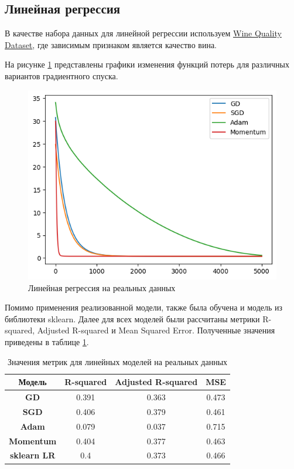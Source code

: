 \documentclass{article}
\begin{document}
\subsection*{Линейная регрессия}
В качестве набора данных для линейной регрессии используем \href{https://www.kaggle.com/datasets/yasserh/wine-quality-dataset}{Wine Quality Dataset}, где зависимым признаком является качество вина. 

На рисунке \ref{lin_real} представлены графики изменения функций потерь для различных вариантов градиентного спуска.

\begin{figure}[h]
    \centering
    \includegraphics[width=0.5\linewidth]{lin_real.png}
    \caption{Линейная регрессия на реальных данных}
    \label{lin_real}
\end{figure}

Помимо применения реализованной модели, также была обучена и модель из библиотеки sklearn. Далее для всех моделей были рассчитаны метрики R-squared, Adjusted R-squared и Mean Squared Error. Полученные значения приведены в таблице \ref{lin_metrics}.

\begin{table}[h]
    \centering
    \begin{tabular}{c|c|c|c}
        \textbf{Модель}& \textbf{R-squared} & \textbf{Adjusted R-squared} & \textbf{MSE} \\\hline
         \textbf{GD}&0.391&0.363& 0.473\\
         \textbf{SGD}& 0.406&0.379& 0.461\\
         \textbf{Adam} & 0.079&0.037& 0.715\\
         \textbf{Momentum }& 0.404&0.377& 0.463\\
         \textbf{sklearn LR} & 0.4&0.373& 0.466\\
    \end{tabular}
    \caption{Значения метрик для линейных моделей на реальных данных}
    \label{lin_metrics}
\end{table}
\end{document}
